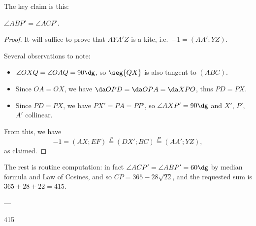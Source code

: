 The key claim is this:
\begin{iclaim*}
    $\angle ABP'=\angle ACP'$.
\end{iclaim*}
\begin{proof}
    It will suffice to prove that $AYA'Z$ is a kite, i.e.\ $-1=(AA';YZ)$.

    Several observations to note:
    \begin{itemize}[itemsep=0em]
        \item $\angle OXQ=\angle OAQ=90\dg$, so $\seg{QX}$ is also tangent to $(ABC)$.
        \item Since $OA=OX$, we have $\da OPD=\da OPA=\da XPO$, thus $PD=PX$.
        \item Since $PD=PX$, we have $PX'=PA=PP'$, so $\angle AXP'=90\dg$ and $X'$, $P'$, $A'$ collinear.
    \end{itemize}
    From this, we have \[-1=(AX;EF)\stackrel P=(DX';BC)\stackrel{P'}=(AA';YZ),\]
    as claimed.
\end{proof}

The rest is routine computation: in fact $\angle ACP'=\angle ABP'=60\dg$ by median formula and Law of Cosines, and so $CP=365-28\sqrt{22}$, and the requested sum is $365+28+22=415$.

---

415
